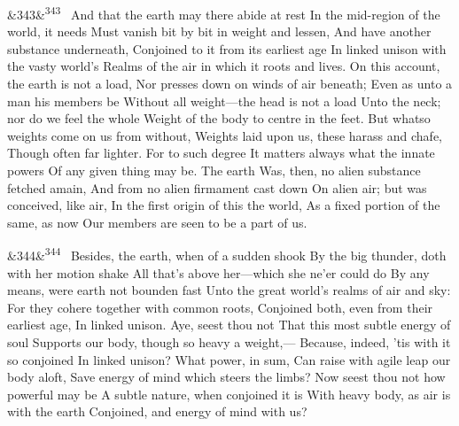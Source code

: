 \documentclass[12pt]{article}
\newcommand{\para}[1][]{\par\noindent\ifx&#1&\else\textsuperscript{\footnotesize #1}~\fi}
\begin{document}
\para[343] And that the earth may there abide at rest In the mid-region of the world, it needs Must vanish bit by bit in weight and lessen, And have another substance underneath, Conjoined to it from its earliest age In linked unison with the vasty world's Realms of the air in which it roots and lives. On this account, the earth is not a load, Nor presses down on winds of air beneath; Even as unto a man his members be Without all weight---the head is not a load Unto the neck; nor do we feel the whole Weight of the body to centre in the feet. But whatso weights come on us from without, Weights laid upon us, these harass and chafe, Though often far lighter. For to such degree It matters always what the innate powers Of any given thing may be. The earth Was, then, no alien substance fetched amain, And from no alien firmament cast down On alien air; but was conceived, like air, In the first origin of this the world, As a fixed portion of the same, as now Our members are seen to be a part of us.

\para[344] Besides, the earth, when of a sudden shook By the big thunder, doth with her motion shake All that's above her---which she ne'er could do By any means, were earth not bounden fast Unto the great world's realms of air and sky: For they cohere together with common roots, Conjoined both, even from their earliest age, In linked unison. Aye, seest thou not That this most subtle energy of soul Supports our body, though so heavy a weight,--- Because, indeed, 'tis with it so conjoined In linked unison? What power, in sum, Can raise with agile leap our body aloft, Save energy of mind which steers the limbs? Now seest thou not how powerful may be A subtle nature, when conjoined it is With heavy body, as air is with the earth Conjoined, and energy of mind with us?
\end{document}
